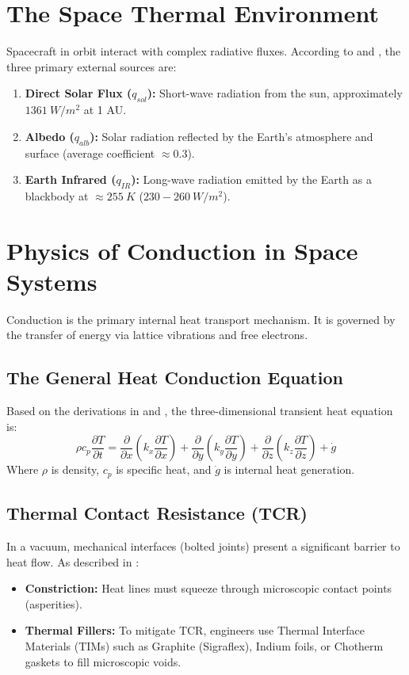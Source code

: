 \documentclass[12pt,a4paper]{report}
\begin{document}
\section{The Space Thermal Environment}
Spacecraft in orbit interact with complex radiative fluxes. According to \cite{th_background} and \cite{Radiacion_1}, the three primary external sources are:
\begin{enumerate}
    \item \textbf{Direct Solar Flux ($q_{sol}$):} Short-wave radiation from the sun, approximately $1361~W/m^2$ at 1 AU.
    \item \textbf{Albedo ($q_{alb}$):} Solar radiation reflected by the Earth's atmosphere and surface (average coefficient $\approx 0.3$).
    \item \textbf{Earth Infrared ($q_{IR}$):} Long-wave radiation emitted by the Earth as a blackbody at $\approx 255~K$ ($230-260~W/m^2$).
\end{enumerate}

\section{Physics of Conduction in Space Systems}
Conduction is the primary internal heat transport mechanism. It is governed by the transfer of energy via lattice vibrations and free electrons.

\subsection{The General Heat Conduction Equation}
Based on the derivations in \cite{Conduc_1} and \cite{Conduc_2}, the three-dimensional transient heat equation is:
\begin{equation}
    \rho c_p \frac{\partial T}{\partial t} = \frac{\partial}{\partial x}\left(k_x \frac{\partial T}{\partial x}\right) + \frac{\partial}{\partial y}\left(k_y \frac{\partial T}{\partial y}\right) + \frac{\partial}{\partial z}\left(k_z \frac{\partial T}{\partial z}\right) + \dot{g}
\end{equation}
Where $\rho$ is density, $c_p$ is specific heat, and $\dot{g}$ is internal heat generation.

\subsection{Thermal Contact Resistance (TCR)}
In a vacuum, mechanical interfaces (bolted joints) present a significant barrier to heat flow. As described in \cite{Conduc_3}:
\begin{itemize}
    \item \textbf{Constriction:} Heat lines must squeeze through microscopic contact points (asperities).
    \item \textbf{Thermal Fillers:} To mitigate TCR, engineers use Thermal Interface Materials (TIMs) such as Graphite (Sigraflex), Indium foils, or Chotherm gaskets to fill microscopic voids.
\end{itemize}
\end{document}
